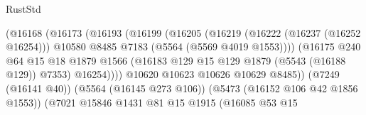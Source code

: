 \begin{lexlean}{RustStd}
\begin{coremodule}
                                              (@16168
                                                (@16173
                                                  (@16193
                                                    (@16199
                                                      (@16205
                                                        (@16219
                                                          (@16222 (@16237 (@16252 @16254)))
                                                          @10580
                                                          @8485
                                                          @7183
                                                          (@5564 (@5569 @4019 @1553))))
                                                      (@16175
                                                        @240
                                                        @64
                                                        @15
                                                        @18
                                                        @1879
                                                        @1566
                                                        (@16183
                                                          @129
                                                          @15
                                                          @129
                                                          @1879
                                                          (@5543 (@16188 @129))
                                                          @7353)
                                                        @16254))))
                                                @10620
                                                @10623
                                                @10626
                                                @10629
                                                @8485))
                                            (@7249 (@16141 @40))
                                            (@5564 (@16145 @273 @106))
                                            (@5473 (@16152 @106 @42 @1856 @1553))
                                            (@7021
                                              @15846
                                              @1431
                                              @81
                                              @15
                                              @1915
                                              (@16085
                                                @53
                                                @15

\end{coremodule}
\end{lexlean}
